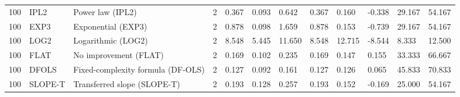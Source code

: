 \begin{tabular}{llllllllllll}
100 & IPL2 & Power law (IPL2) & 2 & 0.367 & 0.093 & 0.642 & 0.367 & 0.160 & -0.338 & 29.167 & 54.167 \\
100 & EXP3 & Exponential (EXP3) & 2 & 0.878 & 0.098 & 1.659 & 0.878 & 0.153 & -0.739 & 29.167 & 54.167 \\
100 & LOG2 & Logarithmic (LOG2) & 2 & 8.548 & 5.445 & 11.650 & 8.548 & 12.715 & -8.544 & 8.333 & 12.500 \\
100 & FLAT & No improvement (FLAT) & 2 & 0.169 & 0.102 & 0.235 & 0.169 & 0.147 & 0.155 & 33.333 & 66.667 \\
100 & DFOLS & Fixed-complexity formula (DF-OLS) & 2 & 0.127 & 0.092 & 0.161 & 0.127 & 0.126 & 0.065 & 45.833 & 70.833 \\
100 & SLOPE-T & Transferred slope (SLOPE-T) & 2 & 0.193 & 0.128 & 0.257 & 0.193 & 0.152 & -0.169 & 25.000 & 54.167 \\
\hline
\end{tabular}
